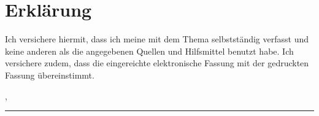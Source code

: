 \thispagestyle{empty}

\section*{Erklärung}
\vspace*{2em}
Ich versichere hiermit, dass ich meine {\arbeit} mit dem Thema {\bf \titel} selbstständig verfasst und keine anderen als die angegebenen Quellen und Hilfsmittel benutzt habe. Ich versichere zudem, dass die eingereichte elektronische Fassung mit der gedruckten Fassung übereinstimmt.

\vspace{3em}

\abgabeort, \datumAbgabe
\vspace{4em}

\rule{6cm}{0.4pt}\\
\autor